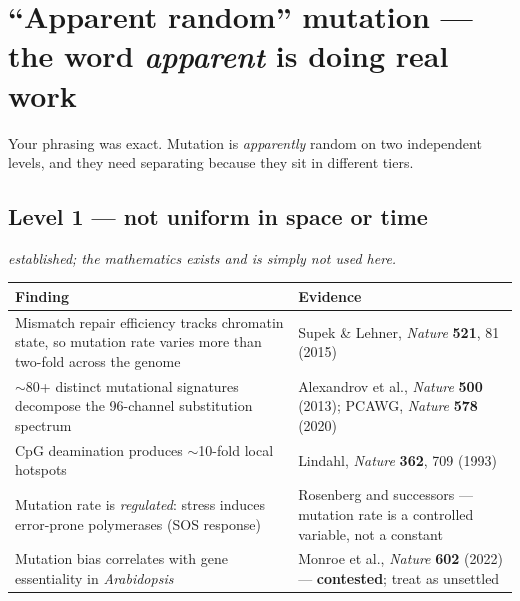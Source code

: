 \clearpage
\renewcommand{\sectioncolor}{quantum}
\section{``Apparent random'' mutation --- the word \emph{apparent} is doing real work}

Your phrasing was exact. Mutation is \emph{apparently} random on two independent levels, and they
need separating because they sit in different tiers.

\subsection{Level 1 --- not uniform in space or time}
\noindent\Ttwo\;\emph{established; the mathematics exists and is simply not used here.}\medskip

\begin{center}\small
\begin{tabular}{@{}>{\raggedright\arraybackslash}p{8.4cm}>{\raggedright\arraybackslash}p{8.2cm}@{}}
\toprule
\rowcolor{quantum!12}
\textbf{\color{quantum}Finding} & \textbf{\color{quantum}Evidence}\\
\midrule
Mismatch repair efficiency tracks chromatin state, so mutation rate varies more than two-fold across
 the genome & Supek \& Lehner, \textit{Nature} \textbf{521}, 81 (2015)\\
$\sim$80+ distinct mutational signatures decompose the 96-channel substitution spectrum &
 Alexandrov et al., \textit{Nature} \textbf{500} (2013); PCAWG, \textit{Nature} \textbf{578} (2020)\\
CpG deamination produces $\sim$10-fold local hotspots & Lindahl, \textit{Nature} \textbf{362}, 709 (1993)\\
Mutation rate is \emph{regulated}: stress induces error-prone polymerases (SOS response) &
 Rosenberg and successors --- mutation rate is a controlled variable, not a constant\\
\rowcolor{alert!7}
Mutation bias correlates with gene essentiality in \textit{Arabidopsis} & Monroe et al.,
 \textit{Nature} \textbf{602} (2022) --- \textbf{contested}; treat as unsettled\\
\bottomrule
\end{tabular}
\end{center}

